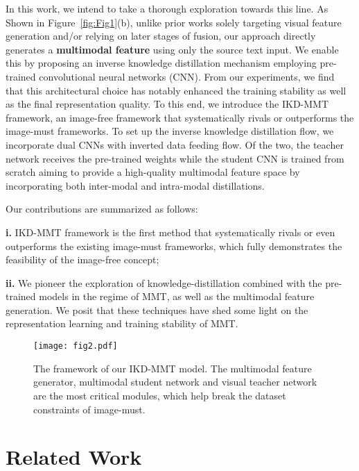 \documentclass[11pt]{article}
\begin{document}
In this work, we intend to take a thorough exploration towards this line.
As Shown in Figure~\ref{fig:Fig1}(b), unlike prior works solely targeting visual feature generation and/or relying on later stages of fusion, our approach directly generates a \textbf{multimodal feature} using only the source text input.
We enable this by proposing an inverse knowledge distillation mechanism employing pre-trained convolutional neural networks (CNN).
From our experiments, we find that this architectural choice has notably enhanced the training stability as well as the final representation quality.
To this end, we introduce the IKD-MMT framework, an image-free framework that systematically rivals or outperforms the image-must frameworks.
To set up the inverse knowledge distillation flow, we incorporate dual CNNs with inverted data feeding flow.
Of the two, the teacher network receives the pre-trained weights while the student CNN is trained from scratch aiming to provide a high-quality multimodal feature space by incorporating both inter-modal and intra-modal distillations.

Our contributions are summarized as follows:

\textbf{i.} IKD-MMT framework is the first method that systematically rivals or even outperforms the existing image-must frameworks, which fully demonstrates the feasibility of the image-free concept;

\textbf{ii.} We pioneer the exploration of knowledge-distillation combined with the pre-trained models in the regime of MMT, as well as the multimodal feature generation. We posit that these techniques have shed some light on the representation learning and training stability of MMT.



\begin{figure*}[!t]
\centering
\setlength{\belowcaptionskip}{-12pt}
{\texttt{[image: fig2.pdf]}\label{fig2}}
\centering
\caption{The framework of our IKD-MMT model.
The multimodal feature generator, multimodal student network and visual teacher network are the most critical modules, which help break the dataset constraints of image-must.
}
\label{fig:Fig2}
\end{figure*}

\section{Related Work}
\end{document}

